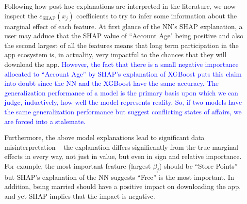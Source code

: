 \documentclass[mnsc,blindrev]{informs3}
\newcommand{\mM}{\mathcal{M}}
\begin{document}
 Following how post hoc explanations are interpreted in the literature, we now inspect the $e_\text{SHAP}(x_j)$ coefficients to try to infer some information about the marginal effect of each feature. At first glance of the NN's SHAP explanation, a user may adduce that the SHAP value of ``Account Age" being positive and also the second largest of all the features means that long term participation in the app ecosystem is, in actuality, very impactful to the chances that they will download the app. \textcolor{blue}{However, the fact that there is a small negative importance allocated to ``Account Age'' by SHAP's explanation of XGBoost puts this claim into doubt since the NN and the XGBoost have the same accuracy. %
 The generalization performance of a model is the primary basis upon which we can judge, inductively, how well the model represents reality. So, if two models have the same generalization performance but suggest conflicting states of affairs, we are forced into a stalemate.}
 


Furthermore, the above model explanations lead to significant data misinterpretation -- the  explanation differs significantly from the true marginal effects in every way, not just in value, but even in sign and relative importance. For example, the most important feature (largest $\beta_j$) should be ``Store Points'' but SHAP's explanation of the NN suggests ``Free'' is the most important. In addition, being married should have a positive impact on downloading the app, and yet SHAP implies that the impact is negative. %
\end{document}
